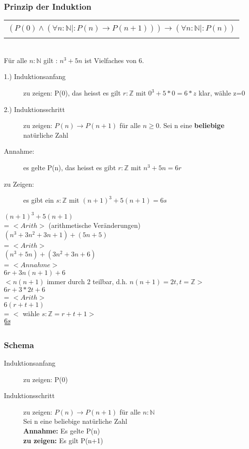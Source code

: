 \documentclass[a4paper,10pt]{article}
\newcommand{\NN}{\mathbb{N}} %
\newcommand{\ZN}{\mathbb{Z}} %
\newcommand{\Bold}[1]{\textbf{#1}} %
\newcommand{\ra}{\rightarrow}
\begin{document}
\subsubsection{Prinzip der Induktion}
\begin{tabular}{| c |}
	\hline \\
		$(P(0) \wedge (\forall n : \NN | : P(n) \ra P(n+1))) \ra (\forall n : \NN | : P(n))$ \\ \\
	\hline
\end{tabular} \\
Für alle $n:\NN$ gilt : $n^3+5n$ ist Vielfaches von 6. \\
\begin{description}
	\item[1.) Induktionsanfang] zu zeigen: P(0), das heisst es gilt $r:\ZN$ mit $0^3+5*0=6*z$ klar, wähle z=0
	\item[2.) Induktionsschritt] zu zeigen: $P(n) \ra P(n+1)$ für alle $n \geq 0$. Sei n eine \Bold {beliebige} natürliche Zahl \\
	\item[Annahme:] es gelte P(n), das heisst es gibt $r:\ZN$ mit $n^3+5n =6r$ 
	\item[zu Zeigen:] es gibt ein $s:\ZN$ mit $(n+1)^3+5(n+1)=6s$
\end{description}
$(n+1)^3 + 5(n+1)$  \\ = $<Arith>$ (arithmetische Veränderungen) \\
$(n^3+3n^2+3n +1)+(5n+5)$ \\ = $<Arith>$ \\
$(n^3+5n) + (3n^2+3n+6)$ \\ = $<Annahme>$ \\
$6r + 3n(n+1)+6$ \\ $<n(n+1)$ immer durch 2 teilbar, d.h. $n(n+1)=2t, t=\ZN>$ \\
$6r +3*2t + 6$ \\ = $<Arith>$ \\
$6(r+t+1)$ \\ = $<$ wähle $s:\ZN=r+t+1>$ \\ $\uuline{6s}$ 

\subsubsection{Schema}
\begin{description}
	\item[Induktionsanfang] zu zeigen: P(0)
	\item[Induktionsschritt] zu zeigen: $P(n) \ra P(n+1)$ für alle $n:\NN$ \\
		Sei n eine beliebige natürliche Zahl \\
		\Bold {Annahme:} Es gelte P(n) \\
		\Bold {zu zeigen:} Es gilt P(n+1)
\end{description}
\end{document}

